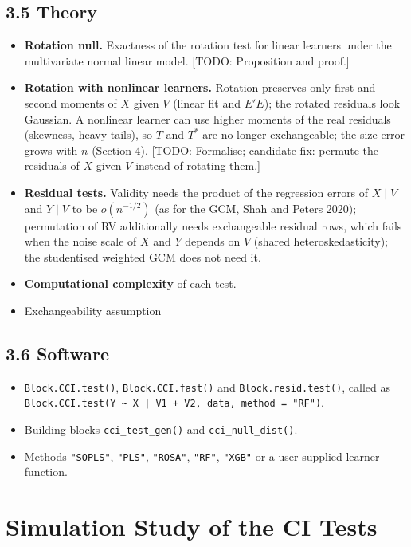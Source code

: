 \documentclass[10pt,leqno]{amsart}
\newcommand{\todo}[1]{{\color{red}[TODO: #1]}}
\newcommand{\fn}[1]{\texttt{#1}}            %
\begin{document}
\subsection*{3.5 Theory}
\begin{itemize}
\item \textbf{Rotation null.} Exactness of the rotation test for linear learners
  under the multivariate normal linear model. \todo{Proposition and proof.}
\item \textbf{Rotation with nonlinear learners.} Rotation preserves only first and
  second moments of $X$ given $V$ (linear fit and $E'E$); the rotated residuals look
  Gaussian. A nonlinear learner can use higher moments of the real residuals
  (skewness, heavy tails), so $T$ and $T^*$ are no longer exchangeable; the size
  error grows with $n$ (Section 4). \todo{Formalise; candidate fix: permute the
  residuals of $X$ given $V$ instead of rotating them.}
\item \textbf{Residual tests.} Validity needs the product of the regression errors
  of $X\mid V$ and $Y\mid V$ to be $o(n^{-1/2})$ (as for the GCM, Shah and Peters 2020);
  permutation of RV additionally needs exchangeable residual rows, which fails when
  the noise scale of $X$ and $Y$ depends on $V$ (shared heteroskedasticity); the
  studentised weighted GCM does not need it.
\item \textbf{Computational complexity} of each test.
\item Exchangeability assumption 
\end{itemize}

\subsection*{3.6 Software}
\begin{itemize}
\item \fn{Block.CCI.test()}, \fn{Block.CCI.fast()} and \fn{Block.resid.test()}, called
  as \fn{Block.CCI.test(Y \textasciitilde{} X | V1 + V2, data, method = "RF")}.
\item Building blocks \fn{cci\_test\_gen()} and \fn{cci\_null\_dist()}.
\item Methods \texttt{"SOPLS"}, \texttt{"PLS"}, \texttt{"ROSA"}, \texttt{"RF"},
  \texttt{"XGB"} or a user-supplied learner function.
\end{itemize}

\section{Simulation Study of the CI Tests}
\end{document}
